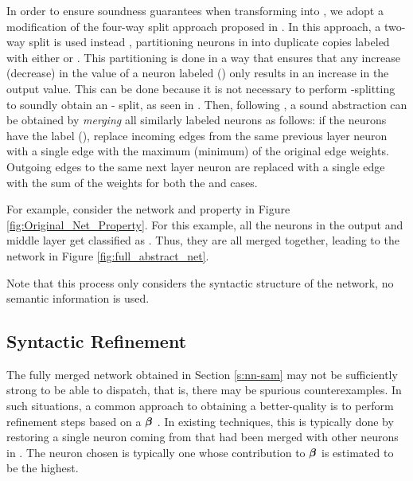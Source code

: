 In order to ensure soundness guarantees when transforming \cnc into \abs, 
we adopt a modification of the four-way split approach proposed in
\cite{cegar-nn}.
In this approach, a two-way split is used instead
\cite{chauhan2022efficiently,liu2022abstraction,10.1145/3644387}, 
partitioning neurons in \cnc into duplicate
copies labeled with either {\inc or \dec}. 
This partitioning is done in a way that 
ensures that any increase 
(decrease) in the value of a neuron labeled \inc (\dec) only results in 
an increase in the output value. This can be done because it is not
necessary to perform \posc-\negc splitting to soundly obtain an \inc-\dec
split, as seen in
\cite{chauhan2022efficiently,liu2022abstraction,10.1145/3644387}. Then,
following \cite{cegar-nn}, a sound 
abstraction can be obtained by \textit{merging} all similarly 
labeled neurons as follows: if the neurons have
the label \inc (\dec), replace incoming edges from the same
previous layer neuron with a single edge with the maximum (minimum) of the
original edge weights. Outgoing edges to the same next layer neuron are replaced
with a single edge with the sum of the weights for both the \inc and \dec cases.




For example, consider the network and property in Figure
\ref{fig:Original_Net_Property}. For this example, all the neurons in the output
and middle layer get classified as \inc. Thus, they are all merged together,
leading to the network in Figure \ref{fig:full_abstract_net}.

Note that this process only considers the syntactic structure of the network, no
semantic information is used.

\subsection{ Syntactic Refinement }

The fully merged network obtained in Section \ref{s:nn-sam} may not be
sufficiently strong to be able to dispatch, that is, there may be 
spurious counterexamples. 
In such situations, a common approach to obtaining a better-quality \abs is to
perform refinement steps based on a \gencex $\boldsymbol{\beta}$
\cite{cegar-nn,cegarette,cleverest-nn}. 
In existing techniques, this is typically done by restoring a single neuron
coming from \cnc that had been merged with other neurons in \abs. The neuron
chosen is typically one whose contribution to $\boldsymbol{\beta}$ is estimated to be
the highest.

